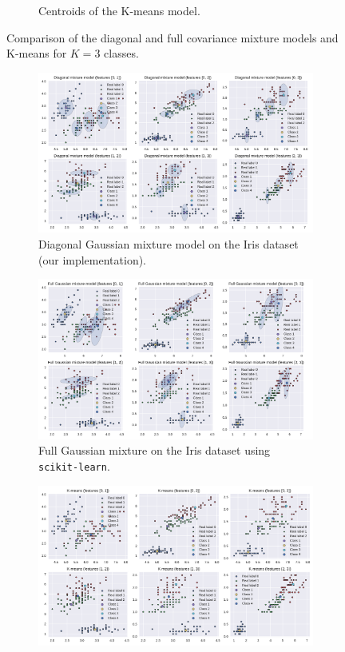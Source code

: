 \documentclass[11pt]{article}
\begin{document}
\begin{figure}
\begin{subfigure}[t]{.8\linewidth}
		\caption{Centroids of the K-means model.}
	\end{subfigure}
	\caption{Comparison of the diagonal and full covariance mixture models and K-means for $K=3$ classes.}\label{fig:EMdiagfullComparisonK3}
\end{figure}

\begin{figure}
	\centering
	\begin{subfigure}[t]{.8\linewidth}
		\includegraphics[width=\linewidth]{images/diag_em_K4.pdf}
		\caption{Diagonal Gaussian mixture model on the Iris dataset (our implementation).}
	\end{subfigure}
	\begin{subfigure}[t]{.8\linewidth}
		\includegraphics[width=\linewidth]{images/full_em_K4.pdf}
		\caption{Full Gaussian mixture on the Iris dataset using \texttt{scikit-learn}.}
	\end{subfigure}
	\begin{subfigure}[t]{.8\linewidth}
		\includegraphics[width=\linewidth]{images/kmeans_K4.pdf}

\end{subfigure}
\end{figure}
\end{document}
